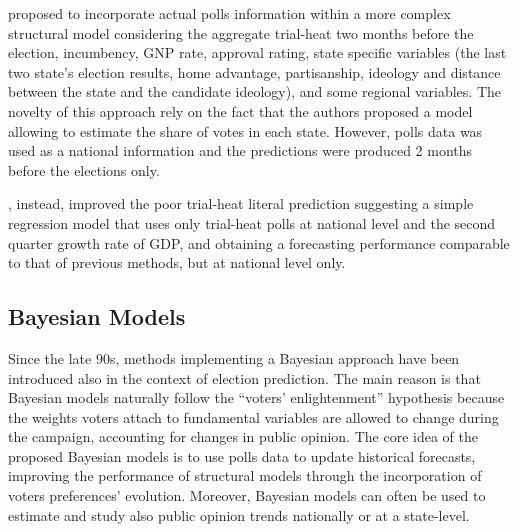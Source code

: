 \documentclass[
  12pt]{article}
\begin{document}
\citet{gel:kin:1993} proposed to incorporate actual polls information
within a more complex structural model considering the aggregate
trial-heat two months before the election, incumbency, GNP rate,
approval rating, state specific variables (the last two state's election
results, home advantage, partisanship, ideology and distance between the
state and the candidate ideology), and some regional variables. The
novelty of this approach rely on the fact that the authors proposed a
model allowing to estimate the share of votes in each state. However,
polls data was used as a national information and the predictions were
produced 2 months before the elections only.

\citet{cam:1996}, instead, improved the poor trial-heat literal
prediction suggesting a simple regression model that uses only
trial-heat polls at national level and the second quarter growth rate of
GDP, and obtaining a forecasting performance comparable to that of
previous methods, but at national level only.

\hypertarget{bayesian-models}{%
\subsection{Bayesian Models}\label{bayesian-models}}

Since the late 90s, methods implementing a Bayesian approach have been
introduced also in the context of election prediction. The main reason
is that Bayesian models naturally follow the ``voters' enlightenment''
hypothesis because the weights voters attach to fundamental variables
are allowed to change during the campaign, accounting for changes in
public opinion. The core idea of the proposed Bayesian models is to use
polls data to update historical forecasts, improving the performance of
structural models through the incorporation of voters preferences'
evolution. Moreover, Bayesian models can often be used to estimate and
study also public opinion trends nationally or at a state-level.
\end{document}
